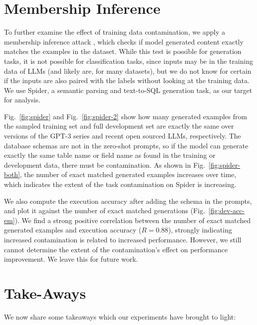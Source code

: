 \documentclass[letterpaper]{article} %
\newcommand{\jmf}[1]{}      %
\begin{document}
\section{Membership Inference}
\label{sec:membershipinference}
\jmf{This is not possible to do for classification tasks.  So we do it for a generation task.}


To further examine the effect of training data contamination, we apply a membership inference attack \cite{hu2022}, which checks if model generated content exactly matches the examples in the dataset. While this test is possible for generation tasks, it is not possible for classification tasks, since inputs may be in the training data of LLMs (and likely are, for many datasets), but we do not know for certain if the inputs are also paired with the labels without looking at the training data. We use Spider, a semantic parsing and text-to-SQL generation task, \cite{yu2018} as our target for analysis.

Fig.~\ref{fig:spider} and Fig.~\ref{fig:spider-2} show how many generated examples from the sampled training set and full development set are exactly the same over versions of the GPT-3 series and recent open sourced LLMs, respectively. The database schemas are not in the zero-shot prompts, so if the model can generate exactly the same table name or field name as found in the training or development data, there must be contamination. As shown in Fig.~\ref{fig:spider-both}, the number of exact matched generated examples increases over time, which indicates the extent of the task contamination on Spider is increasing.

We also compute the execution accuracy after adding the schema in the prompts, and plot it against the number of exact matched generations (Fig.~\ref{fig:dev-acc-em}). We find a strong positive correlation between the number of exact matched generated examples and execution accuracy ($R = 0.88$), strongly indicating increased contamination is related to increased performance. However, we still cannot determine the extent of the contamination's effect on performance improvement. We leave this for future work.



\section{Take-Aways}
We now share some takeaways which our experiments have brought to light:
\end{document}
